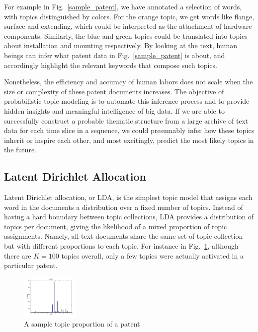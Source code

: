 \documentclass[conference]{IEEEtran}
\begin{document}
For example in Fig.~\ref{sample_patent}, we have annotated a selection of words, with topics distinguished by colors. For the orange topic, we get words like flange, surface and extending, which could be interpreted as the attachment of hardware components. Similarly, the blue and green topics could be translated into topics about installation and mounting respectively. By looking at the text, human beings can infer what patent data in Fig.~\ref{sample_patent} is about, and accordingly highlight the relevant keywords that compose such topics. 

Nonetheless, the efficiency and accuracy of human labors does not scale when the size or complexity of these patent documents increases. The objective of probabilistic topic modeling is to automate this inference process and to provide hidden insights and meaningful intelligence of big data. If we are able to successfully construct a probable thematic structure from a large archive of text data for each time slice in a sequence, we could presumably infer how these topics inherit or inspire each other, and most excitingly, predict the most likely topics in the future.




\subsection{Latent Dirichlet Allocation}
Latent Dirichlet allocation, or LDA, is the simplest topic model \cite{lda2003} that assigns each word in the documents a distribution over a fixed number of topics. Instead of having a hard boundary between topic collections, LDA provides a distribution of topics per document, giving the likelihood of a mixed proportion of topic assignments. Namely, all text documents share the same set of topic collection but with different proportions to each topic. For instance in Fig.~\ref{topic_proportion}, although there are $K=100$ topics overall, only a few topics were actually activated in a particular patent.

\begin{figure}[h]
	\center
	\includegraphics[width=0.25\textwidth]{fig/pat8_topics.png}
	\caption{A sample topic proportion of a patent}
	\label{topic_proportion}
\end{figure}
\end{document}
